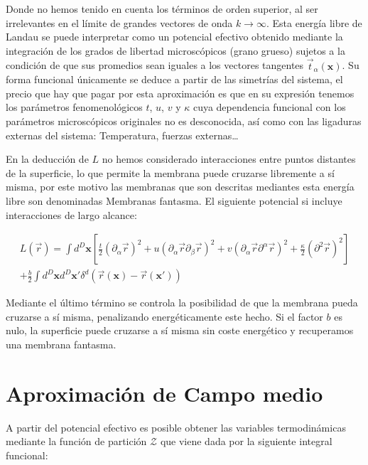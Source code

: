 
Donde no hemos tenido en cuenta los términos de orden superior, al ser
irrelevantes en el límite de grandes vectores de onda $k\rightarrow \infty$. 
Esta energía libre de Landau se puede interpretar como un potencial efectivo
obtenido mediante la integración de los grados de libertad microscópicos
(grano grueso) sujetos a la condición de que sus promedios sean iguales a los
vectores tangentes $\vec{t}_{\alpha}(\mathbf{x})$. Su forma funcional
únicamente se deduce a partir de las simetrías del sistema, el precio que hay
que pagar por esta aproximación es que en su expresión tenemos los parámetros
fenomenológicos $t$, $u$, $v$ y $\kappa$ cuya dependencia funcional con los
parámetros microscópicos originales no es desconocida, así como con las
ligaduras externas del sistema: Temperatura, fuerzas externas\dots  

En la deducción de $L$ no hemos considerado interacciones entre puntos
distantes de la superficie, lo que permite la membrana puede cruzarse
libremente a sí misma, por este motivo las membranas que son descritas
mediantes esta energía libre son denominadas Membranas fantasma. El siguiente
potencial si incluye interacciones de largo alcance:

\begin{multline}
L(\vec{r})=\int d^D\mathbf{x}
\left[
\frac{t}{2}(\partial_{\alpha}\vec{r})^2+
u(\partial_{\alpha}\vec{r}\partial_{\beta}\vec{r})^2+
v(\partial_{\alpha}\vec{r}\partial^{\alpha}\vec{r})^2+
\frac{\kappa}{2}(\partial^2\vec{r})^2
\right]\\
+\frac{b}{2}\int d^D\mathbf{x} d^D\mathbf{x'}
\delta^{d}(\vec{r}(\mathbf{x})-\vec{r}(\mathbf{x'}))
\end{multline}

Mediante el último término se controla la posibilidad de que la membrana pueda
cruzarse a sí misma, penalizando energéticamente este hecho. Si el factor $b$
es nulo, la superficie puede cruzarse a sí misma sin coste energético y
recuperamos una membrana fantasma.

\section{Aproximación de Campo medio}

A partir del potencial efectivo es posible obtener las variables
termodinámicas mediante la función de partición $\mathcal{Z}$ que viene dada
por la siguiente integral funcional:

